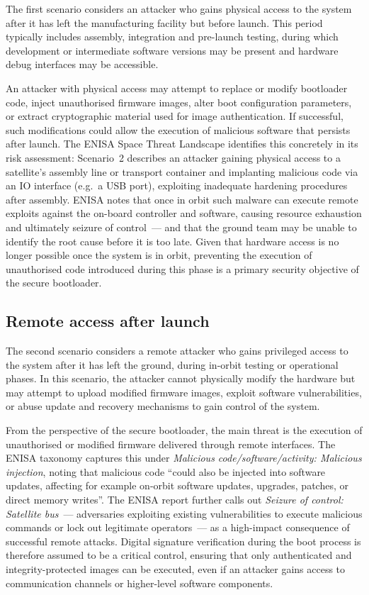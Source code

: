 The first scenario considers an attacker who gains physical access to the system after it has left the manufacturing facility but before launch. This period typically includes assembly, integration and pre-launch testing, during which development or intermediate software versions may be present and hardware debug interfaces may be accessible.

An attacker with physical access may attempt to replace or modify bootloader code, inject unauthorised firmware images, alter boot configuration parameters, or extract cryptographic material used for image authentication. If successful, such modifications could allow the execution of malicious software that persists after launch. The ENISA Space Threat Landscape \cite{enisa_2025} identifies this concretely in its risk assessment: Scenario~2 describes an attacker gaining physical access to a satellite's assembly line or transport container and implanting malicious code via an IO interface (e.g.~a USB port), exploiting inadequate hardening procedures after assembly. ENISA notes that once in orbit such malware can execute remote exploits against the on-board controller and software, causing resource exhaustion and ultimately seizure of control~--- and that the ground team may be unable to identify the root cause before it is too late. Given that hardware access is no longer possible once the system is in orbit, preventing the execution of unauthorised code introduced during this phase is a primary security objective of the secure bootloader.

\subsection{Remote access after launch}
\label{subsection:threatModel-scenarios-remote}

The second scenario considers a remote attacker who gains privileged access to the system after it has left the ground, during in-orbit testing or operational phases. In this scenario, the attacker cannot physically modify the hardware but may attempt to upload modified firmware images, exploit software vulnerabilities, or abuse update and recovery mechanisms to gain control of the system.

From the perspective of the secure bootloader, the main threat is the execution of unauthorised or modified firmware delivered through remote interfaces. The ENISA taxonomy \cite{enisa_2025} captures this under \emph{Malicious code/software/activity: Malicious injection}, noting that malicious code ``could also be injected into software updates, affecting for example on-orbit software updates, upgrades, patches, or direct memory writes''. The ENISA report further calls out \emph{Seizure of control: Satellite bus}~--- adversaries exploiting existing vulnerabilities to execute malicious commands or lock out legitimate operators~--- as a high-impact consequence of successful remote attacks. Digital signature verification during the boot process is therefore assumed to be a critical control, ensuring that only authenticated and integrity-protected images can be executed, even if an attacker gains access to communication channels or higher-level software components.


